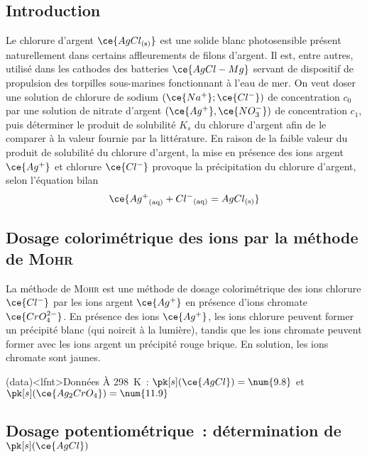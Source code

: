 \documentclass[../main/main.tex]{subfiles}
\begin{document}
{\subsection{Introduction}

Le chlorure d'argent $\ce{AgCl_{\rm(s)}}$ est une solide blanc photosensible
présent naturellement dans certains affleurements de filons d'argent. Il est,
entre autres, utilisé dans les cathodes des batteries $\ce{AgCl-Mg}$ servant
de dispositif de propulsion des torpilles sous-marines fonctionnant à l'eau de
mer.
\smallbreak
On veut doser une solution de chlorure de sodium $(\ce{Na^+};\ce{Cl^-})$ de
concentration $c_0$ par une solution de nitrate d'argent
$(\ce{Ag^+},\ce{NO_3^-})$ de concentration $c_1$, puis déterminer le produit de
solubilité $K_s$ du chlorure d'argent afin de le comparer à la valeur fournie
par la littérature. En raison de la faible valeur du produit de solubilité du
chlorure d'argent, la mise en présence des ions argent $\ce{Ag^+}$ et chlorure
$\ce{Cl^-}$ provoque la précipitation du chlorure d'argent, selon l'équation
bilan
\begin{gather}
	\ce{{Ag^+}_{\rm(aq)} + {Cl^-}_{\rm(aq)} = AgCl_{\rm(s)}}
	\label{eq:prepAgCl}
\end{gather}

\subsection{Dosage colorimétrique des ions  par la méthode de
	\textsc{Mohr}}
La méthode de \textsc{Mohr} est une méthode de dosage colorimétrique des ions
chlorure $\ce{Cl^-}$ par les ions argent $\ce{Ag^+}$ en présence d'ions
chromate $\ce{CrO_4^{2-}}$. En présence des ions $\ce{Ag^+}$, les ions
chlorure peuvent former un précipité blanc (qui noircit à la lumière), tandis
que les ions chromate peuvent former avec les ions argent un précipité rouge
brique. En solution, les ions chromate sont jaunes.
\smallbreak
\begin{tcb}(data)<lfnt>{Données}
	À \SI{298}{K}~:
	$\pk[s](\ce{AgCl}) = \num{9.8}$ et
	$\pk[s](\ce{Ag_2CrO_4}) = \num{11.9}$
\end{tcb}

\subsection{Dosage potentiométrique~: détermination de $\pk[s](\ce{AgCl})$}
}
\end{document}
